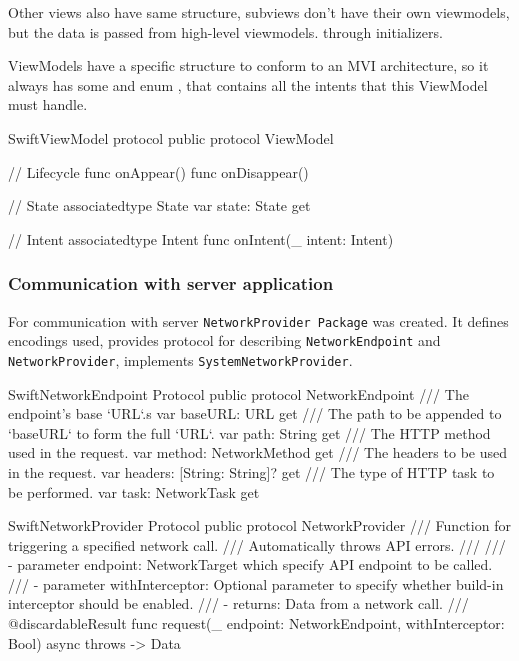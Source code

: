 \documentclass[
  biblatex = false,
  language=english,
  figures=false,
  sourcecodes,
  glossaries,
  index
]{kidiplom}
\begin{document}
Other views also have same structure, subviews don't have their own viewmodels, but the data is passed from high-level viewmodels. through initializers.

ViewModels have a specific structure to conform to an MVI architecture, so it always has some  and enum , that contains all the intents that this ViewModel must handle.

\FloatBarrier
\begin{kicode}{Swift}{}{ViewModel protocol}
public protocol ViewModel {
    // Lifecycle
    func onAppear()
    func onDisappear()
    
    // State
    associatedtype State
    var state: State { get }
    
    // Intent
    associatedtype Intent
    func onIntent(_ intent: Intent)
}
\end{kicode}
\FloatBarrier

\subsubsection{Communication with server application}
For communication with server \texttt{NetworkProvider Package} was created. It defines encodings used, provides protocol for describing \texttt{NetworkEndpoint} and \texttt{NetworkProvider}, implements \texttt{SystemNetworkProvider}.

\FloatBarrier
\begin{kicode}{Swift}{}{NetworkEndpoint Protocol}
public protocol NetworkEndpoint {
    /// The endpoint's base `URL`.s
    var baseURL: URL { get }
    /// The path to be appended to `baseURL` to form the full `URL`.
    var path: String { get }
    /// The HTTP method used in the request.
    var method: NetworkMethod { get }
    /// The headers to be used in the request.
    var headers: [String: String]? { get }
    /// The type of HTTP task to be performed.
    var task: NetworkTask { get }
}
\end{kicode}
\FloatBarrier

\FloatBarrier
\begin{kicode}{Swift}{}{NetworkProvider Protocol}
public protocol NetworkProvider {   
    /// Function for triggering a specified network call.
    /// Automatically throws API errors.
    ///
    /// - parameter endpoint: NetworkTarget which specify API endpoint to be called.
    /// - parameter withInterceptor: Optional parameter to specify whether build-in interceptor should be enabled.
    /// - returns: Data from a network call.
    ///
    @discardableResult
    func request(_ endpoint: NetworkEndpoint, withInterceptor: Bool) async throws -> Data
}
\end{kicode}
\FloatBarrier
\end{document}
